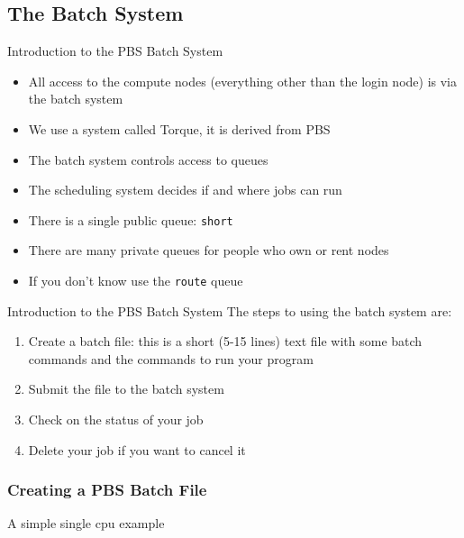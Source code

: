 \documentclass{beamer}
\begin{document}
  \subsection{The Batch System}
  \begin{frame}{Introduction to the PBS Batch System}
    \begin{itemize}
    \item All access to the compute nodes (everything other than the login node)
      is via the batch system
    \item We use a system called Torque, it is derived from PBS
    \item The batch system controls access to queues
    \item The scheduling system decides if and where jobs can run
    \item<2-> There is a single public queue: \texttt{short}
    \item<2-> There are many private queues for people who own or rent nodes
    \item<2-> If you don't know use the \texttt{route} queue
    \end{itemize}
  \end{frame}
  \begin{frame}{Introduction to the PBS Batch System}
    The steps to using the batch system are:
    \begin{enumerate}
    \item Create a batch file: this is a short (5-15 lines) text file with some
      batch commands and the commands to run your program
    \item Submit the file to the batch system
    \item Check on the status of your job
    \item Delete your job if you want to cancel it
    \end{enumerate}
  \end{frame}
\begin{frame}[fragile]
  \frametitle{Creating a PBS Batch File}
A simple single cpu example
  \begin{semiverbatim}
  \end{semiverbatim}
\end{frame}
\end{document}
